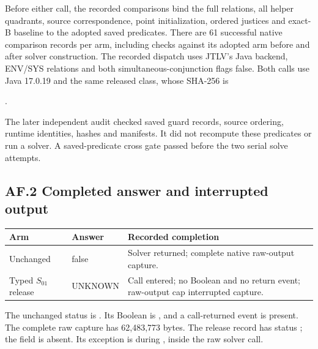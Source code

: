 Before either call, the recorded comparisons bind the full relations,
all helper quadrants, source correspondence, point initialization,
ordered justices and exact-B baseline to the adopted saved predicates.
There are 61 successful native comparison records per arm, including
checks against its adopted arm before and after solver construction.
The recorded dispatch uses JTLV's Java backend, 
ENV/SYS relations and both simultaneous-conjunction flags false.
Both calls use Java 17.0.19 and the same released
 class, whose SHA-256 is
\begin{center}\small
{}.
\end{center}
The later independent audit checked saved guard records, source ordering,
runtime identities, hashes and manifests. It did not recompute these
predicates or run a solver. A saved-predicate cross gate passed before
the two serial solve attempts.

\subsection*{AF.2 Completed answer and interrupted output}
\begin{center}\small
\begin{tabular}{@{}L{30mm}L{31mm}L{86mm}@{}}\toprule
Arm & Answer & Recorded completion\\\midrule
Unchanged & false & Solver returned; complete native raw-output capture.\\
Typed $S_{01}$ release & UNKNOWN & Call entered; no Boolean and no return event; raw-output cap interrupted capture.\\\bottomrule
\end{tabular}
\end{center}
The unchanged status is .
Its Boolean is , and a call-returned event is
present. The complete raw capture has 62,483,773 bytes.
The release record has status ;
the  field is absent. Its exception is
 during ,
inside the raw solver call.

